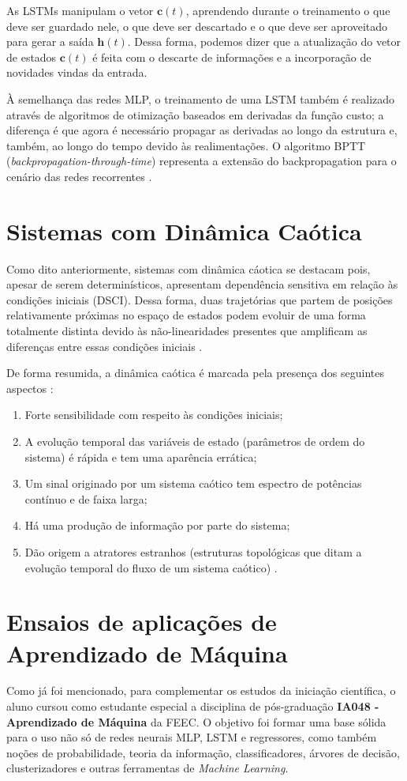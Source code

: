 \documentclass[a4paper, 12pt]{article}
\begin{document}
As LSTMs manipulam o vetor $\mathbf{c}(t)$, aprendendo durante o treinamento o que deve ser guardado nele, o que deve ser descartado e o que deve ser aproveitado para gerar a saída $\mathbf{h}(t)$. Dessa forma, podemos dizer que a atualização do vetor de estados $\mathbf{c}(t)$ é feita com o descarte de informações e a incorporação de novidades vindas da entrada. 

À semelhança das redes MLP, o treinamento de uma LSTM também é realizado através de algoritmos de otimização baseados em derivadas da função custo; a diferença é que agora é necessário propagar as derivadas ao longo da estrutura e, também, ao longo do tempo devido às realimentações. O algoritmo BPTT (\textit{backpropagation-through-time}) representa a extensão do backpropagation para o cenário das redes recorrentes \cite{geron2019hands}. 

\section{Sistemas com Dinâmica Caótica}
Como dito anteriormente, sistemas com dinâmica cáotica se destacam pois, apesar de serem determinísticos, apresentam dependência sensitiva em relação às condições iniciais (DSCI). Dessa forma, duas trajetórias que partem de posições relativamente próximas no espaço de estados podem evoluir de uma forma totalmente distinta devido às não-linearidades presentes que amplificam as diferenças entre essas condições iniciais \cite{fiedler1994caos}.

De forma resumida, a dinâmica caótica é marcada pela presença dos seguintes aspectos \cite{attux2001dinamica}:
\begin{enumerate}
\item Forte sensibilidade com respeito às condições iniciais;
\item A evolução temporal das variáveis de estado (parâmetros de ordem do sistema) é rápida e tem uma aparência errática;
\item Um sinal originado por um sistema caótico tem espectro de potências contínuo e de faixa larga;
\item Há uma produção de informação por parte do sistema;
\item Dão origem a atratores estranhos (estruturas topológicas que ditam a evolução temporal do fluxo de um sistema caótico) \cite{ruelle1971nature}.
\end{enumerate}

\section{Ensaios de aplicações de Aprendizado de Máquina}
Como já foi mencionado, para complementar os estudos da iniciação científica, o aluno cursou como estudante especial a disciplina de pós-graduação \textbf{IA048 - Aprendizado de Máquina} da FEEC. O objetivo foi formar uma base sólida para o uso não só de redes neurais MLP, LSTM e regressores, como também noções de probabilidade, teoria da informação, classificadores, árvores de decisão, clusterizadores e outras ferramentas de \textit{Machine Learning}.
\end{document}
